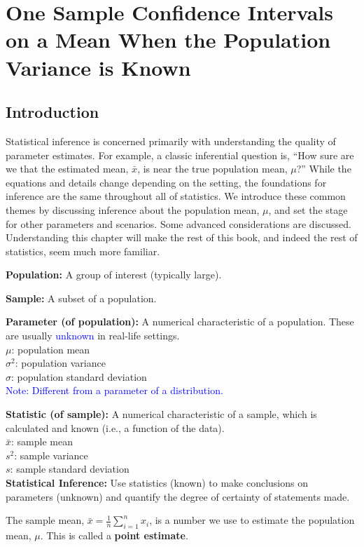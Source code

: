 \chapter{One Sample Confidence Intervals on a Mean When the Population Variance is Known}
\section{Introduction}
Statistical inference is concerned primarily with understanding the quality of parameter estimates. For example, a classic inferential question is, ``How sure are we that the estimated mean, $\bar{x}$, is near the true population mean, $\mu$?'' While the equations and details change depending on the setting, the foundations for inference are the same throughout all of statistics. We introduce these common themes by discussing inference about the population mean, $\mu$, and set the stage for other parameters and scenarios. Some advanced considerations are discussed. Understanding this chapter will make the rest of this book, and indeed the rest of statistics, seem much more familiar.

\begin{definition}
\textbf{Population:} A group of interest (typically large). 
\vspace{0.1em}

\textbf{Sample:} A subset of a population. 

\textbf{Parameter (of population):} A numerical characteristic of a population. These are usually \textcolor{blue}{unknown} in real-life settings. \\
\hspace*{1em} $\mu$: population mean \\
\hspace*{1em} $\sigma^2$: population variance \\
\hspace*{1em} $\sigma$: population standard deviation \\
\textcolor{blue}{Note: Different from a parameter of a distribution.} 

\textbf{Statistic (of sample):} A numerical characteristic of a sample, which is calculated and known (i.e., a function of the data). \\
\hspace*{1em} $\bar{x}$: sample mean \\
\hspace*{1em} $s^2$: sample variance \\
\hspace*{1em} $s$: sample standard deviation \\

\textbf{Statistical Inference:} Use statistics (known) to make conclusions on parameters (unknown) and quantify the degree of certainty of statements made.

\end{definition}
\noindent
The sample mean, $\bar{x} = \frac{1}{n} \sum_{i=1}^{n} x_i$, is a number we use to estimate the population mean, $\mu$. This is called a \textbf{point estimate}. %

